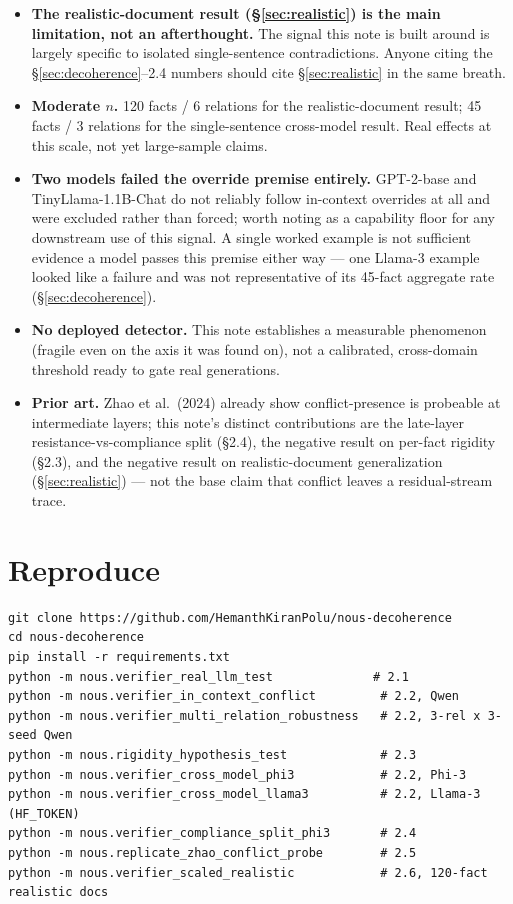 \documentclass[11pt]{article}
\begin{document}
\begin{itemize}
\item \textbf{The realistic-document result (\S\ref{sec:realistic}) is the
  main limitation, not an afterthought.} The signal this note is built
  around is largely specific to isolated single-sentence contradictions.
  Anyone citing the \S\ref{sec:decoherence}--2.4 numbers should cite
  \S\ref{sec:realistic} in the same breath.
\item \textbf{Moderate $n$.} 120 facts / 6 relations for the
  realistic-document result; 45 facts / 3 relations for the single-sentence
  cross-model result. Real effects at this scale, not yet large-sample
  claims.
\item \textbf{Two models failed the override premise entirely.} GPT-2-base
  and TinyLlama-1.1B-Chat do not reliably follow in-context overrides at all
  and were excluded rather than forced; worth noting as a capability floor
  for any downstream use of this signal. A single worked example is not
  sufficient evidence a model passes this premise either way --- one
  Llama-3 example looked like a failure and was not representative of its
  45-fact aggregate rate (\S\ref{sec:decoherence}).
\item \textbf{No deployed detector.} This note establishes a measurable
  phenomenon (fragile even on the axis it was found on), not a calibrated,
  cross-domain threshold ready to gate real generations.
\item \textbf{Prior art.} Zhao et al.\ (2024) already show conflict-presence
  is probeable at intermediate layers; this note's distinct contributions
  are the late-layer resistance-vs-compliance split (\S2.4), the negative
  result on per-fact rigidity (\S2.3), and the negative result on
  realistic-document generalization (\S\ref{sec:realistic}) --- not the base
  claim that conflict leaves a residual-stream trace.
\end{itemize}

\section{Reproduce}

\begin{verbatim}
git clone https://github.com/HemanthKiranPolu/nous-decoherence
cd nous-decoherence
pip install -r requirements.txt
python -m nous.verifier_real_llm_test              # 2.1
python -m nous.verifier_in_context_conflict         # 2.2, Qwen
python -m nous.verifier_multi_relation_robustness   # 2.2, 3-rel x 3-seed Qwen
python -m nous.rigidity_hypothesis_test             # 2.3
python -m nous.verifier_cross_model_phi3            # 2.2, Phi-3
python -m nous.verifier_cross_model_llama3          # 2.2, Llama-3 (HF_TOKEN)
python -m nous.verifier_compliance_split_phi3       # 2.4
python -m nous.replicate_zhao_conflict_probe        # 2.5
python -m nous.verifier_scaled_realistic            # 2.6, 120-fact realistic docs
\end{verbatim}
\end{document}
